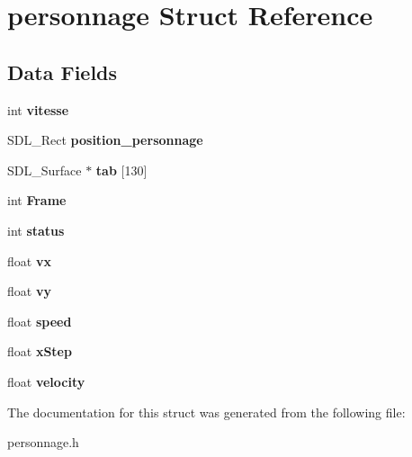 \hypertarget{structpersonnage}{}\section{personnage Struct Reference}
\label{structpersonnage}
\subsection*{Data Fields}
\begin{DoxyCompactItemize}
\item 
int {\bfseries vitesse}\hypertarget{structpersonnage_ad87c7202fadb5ed485e21a7d2e46bbb0}{}\label{structpersonnage_ad87c7202fadb5ed485e21a7d2e46bbb0}

\item 
S\+D\+L\+\_\+\+Rect {\bfseries position\+\_\+personnage}\hypertarget{structpersonnage_ad4e401f6159b91fb45f15a6364fe8ec7}{}\label{structpersonnage_ad4e401f6159b91fb45f15a6364fe8ec7}

\item 
S\+D\+L\+\_\+\+Surface $\ast$ {\bfseries tab} \mbox{[}130\mbox{]}\hypertarget{structpersonnage_a0588e06ca391d1d4506d325735e6b145}{}\label{structpersonnage_a0588e06ca391d1d4506d325735e6b145}

\item 
int {\bfseries Frame}\hypertarget{structpersonnage_ab7d133af1e621289430340a768c0ecc4}{}\label{structpersonnage_ab7d133af1e621289430340a768c0ecc4}

\item 
int {\bfseries status}\hypertarget{structpersonnage_a113460e98f519e470541d9e8791e3795}{}\label{structpersonnage_a113460e98f519e470541d9e8791e3795}

\item 
float {\bfseries vx}\hypertarget{structpersonnage_a41583ba810c10be1d69907f7365d9102}{}\label{structpersonnage_a41583ba810c10be1d69907f7365d9102}

\item 
float {\bfseries vy}\hypertarget{structpersonnage_a3e6e77e5e937da8bebe9dd73691c618e}{}\label{structpersonnage_a3e6e77e5e937da8bebe9dd73691c618e}

\item 
float {\bfseries speed}\hypertarget{structpersonnage_aa5448ab2383bcb1925d353e51357b0e1}{}\label{structpersonnage_aa5448ab2383bcb1925d353e51357b0e1}

\item 
float {\bfseries x\+Step}\hypertarget{structpersonnage_a54bf7b0b137e7cc2beefa53ad60ad086}{}\label{structpersonnage_a54bf7b0b137e7cc2beefa53ad60ad086}

\item 
float {\bfseries velocity}\hypertarget{structpersonnage_a98a74c8ec3e84ccef6cfdd8eb273e154}{}\label{structpersonnage_a98a74c8ec3e84ccef6cfdd8eb273e154}

\end{DoxyCompactItemize}


The documentation for this struct was generated from the following file\+:\begin{DoxyCompactItemize}
\item 
personnage.\+h\end{DoxyCompactItemize}
